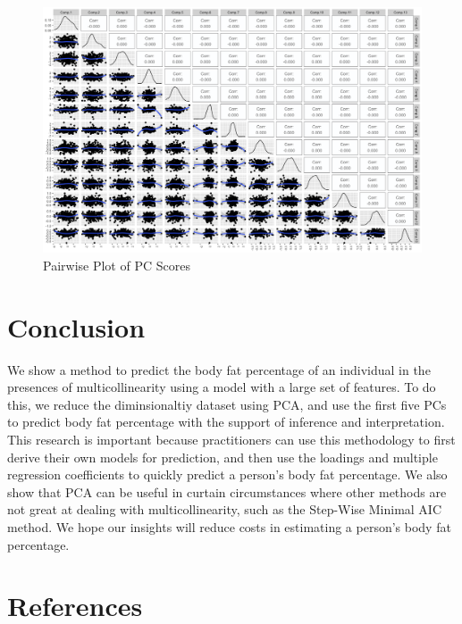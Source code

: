 \documentclass[letterpaper, 12pt]{article}
\begin{document}
	\begin{figure}[!htbp]\centering
		\caption{Pairwise Plot of PC Scores}
		\label{fig:scores_plot}
		\includegraphics[scale=.37]{PCPlot.png}
	\end{figure}
	\section{Conclusion}
	We show a method to predict the body fat percentage of an individual in the presences of multicollinearity using a model with a large set of features.  To do this, we reduce the diminsionaltiy dataset using PCA, and use the first five PCs to predict body fat percentage with the support of inference and interpretation.  This research is important because practitioners can use this methodology to first derive their own models for prediction, and then use the loadings and multiple regression coefficients to quickly predict a person's body fat percentage.  We also show that PCA can be useful in curtain circumstances where other methods are not great at dealing with multicollinearity, such as the Step-Wise Minimal AIC method.  We hope our insights will reduce costs in estimating a person's body fat percentage.

	\pagebreak
	
	\section{References}
	
\end{document}
